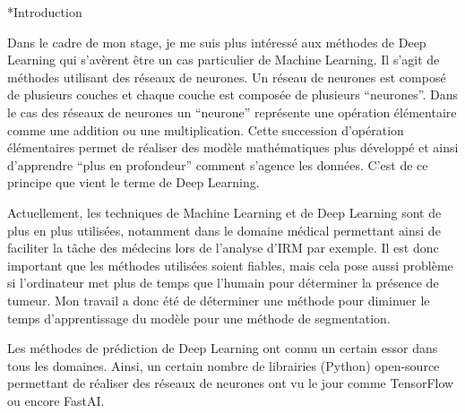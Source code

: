 \documentclass{book}
\newcommand{\p}{\vspace{0.2cm}}
\begin{document}
	\begin{chapter}*{Introduction}


		Dans le cadre de mon stage, je me suis plus intéressé aux méthodes de Deep Learning qui s'avèrent être un cas particulier de Machine Learning. Il s'agit de méthodes utilisant des réseaux de neurones. Un réseau de neurones est composé de plusieurs couches et chaque couche est composée de plusieurs ``neurones''. Dans le cas des réseaux de neurones un ``neurone'' représente une opération élémentaire comme une addition ou une multiplication. Cette succession d'opération élémentaires permet de réaliser des modèle mathématiques plus développé et ainsi d'apprendre ``plus en profondeur'' comment s'agence les données. C'est de ce principe que vient le terme de Deep Learning.\p

		Actuellement, les techniques de Machine Learning et de Deep Learning sont de plus en plus utilisées, notamment dans le domaine médical permettant ainsi de faciliter la tâche des médecins lors de l'analyse d'IRM par exemple. Il est donc important que les méthodes utilisées soient fiables, mais cela pose aussi problème si l'ordinateur met plus de temps que l'humain pour déterminer la présence de tumeur. Mon travail a donc été de déterminer une méthode pour diminuer le temps d'apprentissage du modèle pour une méthode de segmentation.\p

		Les méthodes de prédiction de Deep Learning ont connu un certain essor dans tous les domaines. Ainsi, un certain nombre de librairies (Python) open-source permettant de réaliser des réseaux de neurones ont vu le jour comme TensorFlow ou encore FastAI.\p

	\end{chapter}
\end{document}
